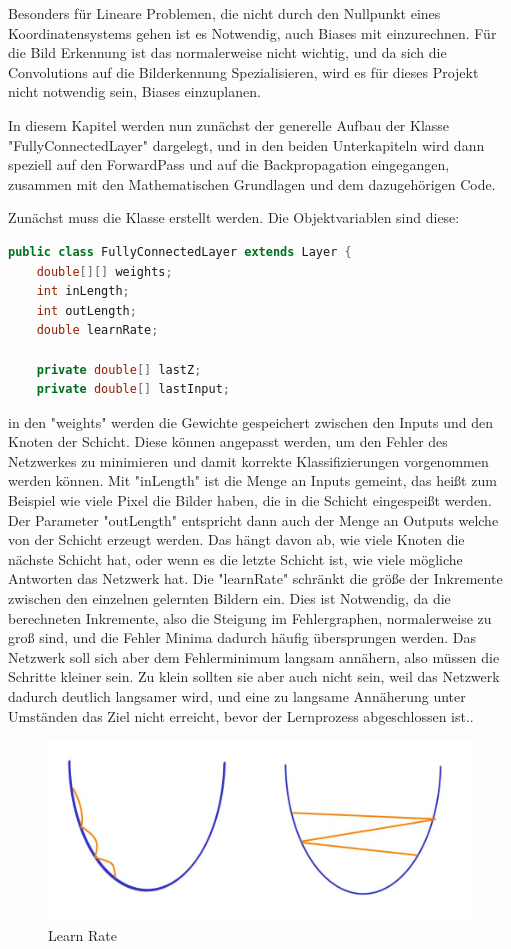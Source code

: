 \documentclass[12pt]{article}
\begin{document}
Besonders für Lineare Problemen, die nicht durch den Nullpunkt eines Koordinatensystems gehen ist es Notwendig, auch Biases mit einzurechnen. Für die Bild Erkennung ist das normalerweise nicht wichtig, und da sich die Convolutions auf die Bilderkennung Spezialisieren, wird es für dieses Projekt nicht notwendig sein, Biases einzuplanen.

In diesem Kapitel werden nun zunächst der generelle Aufbau der Klasse "FullyConnectedLayer" dargelegt, und in den beiden Unterkapiteln wird dann speziell auf den ForwardPass und auf die Backpropagation eingegangen, zusammen mit den Mathematischen Grundlagen und dem dazugehörigen Code.

Zunächst muss die Klasse erstellt werden. Die Objektvariablen sind diese:
    
\begin{lstlisting}[language=Java]
public class FullyConnectedLayer extends Layer {
    double[][] weights;
    int inLength;
    int outLength;
    double learnRate;

    private double[] lastZ;
    private double[] lastInput;
\end{lstlisting} 
in den "weights" werden die Gewichte gespeichert zwischen den Inputs und den Knoten der Schicht. Diese können angepasst werden, um den Fehler des Netzwerkes zu minimieren und damit korrekte Klassifizierungen vorgenommen werden können.
Mit "inLength" ist die Menge an Inputs gemeint, das heißt zum Beispiel wie viele Pixel die Bilder haben, die in die Schicht eingespeißt werden.
Der Parameter "outLength" entspricht dann auch der Menge an Outputs welche von der Schicht erzeugt werden. Das hängt davon ab, wie viele Knoten die nächste Schicht hat, oder wenn es die letzte Schicht ist, wie viele mögliche Antworten das Netzwerk hat.
Die "learnRate" schränkt die größe der Inkremente zwischen den einzelnen gelernten Bildern ein. Dies ist Notwendig, da die berechneten Inkremente, also die Steigung im Fehlergraphen, normalerweise zu groß sind, und die Fehler Minima dadurch häufig übersprungen werden. Das Netzwerk soll sich aber dem Fehlerminimum langsam annähern, also müssen die Schritte kleiner sein. Zu klein sollten sie aber auch nicht sein, weil das Netzwerk dadurch deutlich langsamer wird, und eine zu langsame Annäherung unter Umständen das Ziel nicht erreicht, bevor der Lernprozess abgeschlossen ist..

\begin{figure}[H]
\centering
\includegraphics[scale=0.50]{./Images/BA_006_LearnRate.jpg}
\caption{Learn Rate}
\label{Learn Rate}
\end{figure}
\end{document}
